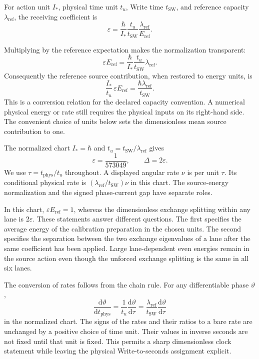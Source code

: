 \documentclass[10pt,twocolumn,letterpaper]{article}
\begin{document}
For action unit $I_*$, physical time unit $t_u$, Write time $t_{\mathrm{SW}}$, and reference capacity $\lambda_{\mathrm{ref}}$, the receiving coefficient is
\begin{equation}
\varepsilon=\frac{\hbar}{I_*}\frac{t_u}{t_{\mathrm{SW}}}\frac{\lambda_{\mathrm{ref}}}{E_{\mathrm{ref}}}.
\tag{9}
\end{equation}

Multiplying by the reference expectation makes the normalization transparent:
\[
\varepsilon E_{\mathrm{ref}}
=\frac{\hbar}{I_*}\frac{t_u}{t_{\mathrm{SW}}}
\lambda_{\mathrm{ref}}.
\]
Consequently the reference source contribution, when restored to energy units, is
\[
\frac{I_*}{t_u}\,\varepsilon E_{\mathrm{ref}}
=\frac{\hbar\lambda_{\mathrm{ref}}}{t_{\mathrm{SW}}}.
\]
This is a conversion relation for the declared capacity convention. A numerical physical energy or rate still requires the physical inputs on its right-hand side. The convenient choice of units below sets the dimensionless mean source contribution to one.


The normalized chart $I_*=\hbar$ and $t_u=t_{\mathrm{SW}}/\lambda_{\mathrm{ref}}$ gives
\begin{equation}
\varepsilon=\frac{1}{573049},\qquad \Delta=2\varepsilon.
\tag{10}
\end{equation}
We use $\tau=t_{\mathrm{phys}}/t_u$ throughout. A displayed angular rate $\nu$ is per unit $\tau$. Its conditional physical rate is $(\lambda_{\mathrm{ref}}/t_{\mathrm{SW}})\nu$ in this chart. The source-energy normalization and the signed phase-current gap have separate roles.

In this chart, $\varepsilon E_{\mathrm{ref}}=1$, whereas the dimensionless exchange splitting within any lane is $2\varepsilon$. These statements answer different questions. The first specifies the average energy of the calibration preparation in the chosen units. The second specifies the separation between the two exchange eigenvalues of a lane after the same coefficient has been applied. Large lane-dependent even energies remain in the source action even though the unforced exchange splitting is the same in all six lanes.

The conversion of rates follows from the chain rule. For any differentiable phase $\vartheta$,
\[
\frac{\mathrm d\vartheta}{\mathrm dt_{\mathrm{phys}}}
=\frac{1}{t_u}\frac{\mathrm d\vartheta}{\mathrm d\tau}
=\frac{\lambda_{\mathrm{ref}}}{t_{\mathrm{SW}}}
\frac{\mathrm d\vartheta}{\mathrm d\tau}
\]
in the normalized chart. The signs of the rates and their ratios to a bare rate are unchanged by a positive choice of time unit. Their values in inverse seconds are not fixed until that unit is fixed. This permits a sharp dimensionless clock statement while leaving the physical Write-to-seconds assignment explicit.
\end{document}
